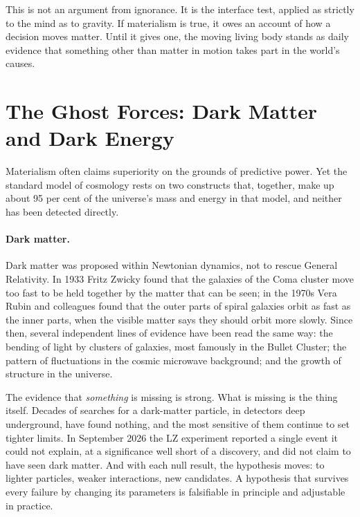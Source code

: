 \documentclass[11pt,a4paper]{article}
\begin{document}
This is not an argument from ignorance. It is the interface test, applied as strictly to the mind as to gravity. If materialism is true, it owes an account of how a decision moves matter. Until it gives one, the moving living body stands as daily evidence that something other than matter in motion takes part in the world's causes.

\section{The Ghost Forces: Dark Matter and Dark Energy}
\label{sec:ghost}

Materialism often claims superiority on the grounds of predictive power. Yet the standard model of cosmology rests on two constructs that, together, make up about 95 per cent of the universe's mass and energy in that model, and neither has been detected directly.

\paragraph{Dark matter.} Dark matter was proposed within Newtonian dynamics, not to rescue General Relativity. In 1933 Fritz Zwicky found that the galaxies of the Coma cluster move too fast to be held together by the matter that can be seen; in the 1970s Vera Rubin and colleagues found that the outer parts of spiral galaxies orbit as fast as the inner parts, when the visible matter says they should orbit more slowly. Since then, several independent lines of evidence have been read the same way: the bending of light by clusters of galaxies, most famously in the Bullet Cluster; the pattern of fluctuations in the cosmic microwave background; and the growth of structure in the universe.

The evidence that \emph{something} is missing is strong. What is missing is the thing itself. Decades of searches for a dark-matter particle, in detectors deep underground, have found nothing, and the most sensitive of them continue to set tighter limits. In September 2026 the LZ experiment reported a single event it could not explain, at a significance well short of a discovery, and did not claim to have seen dark matter. And with each null result, the hypothesis moves: to lighter particles, weaker interactions, new candidates. A hypothesis that survives every failure by changing its parameters is falsifiable in principle and adjustable in practice.
\end{document}
